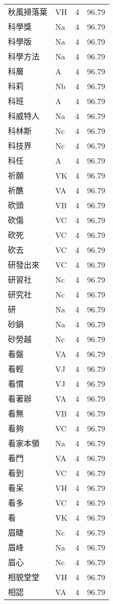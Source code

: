 \documentclass[twocolumn]{book}
\begin{document}
\begin{supertabular}{llrr}
秋風掃落葉 & VH & 4 &  96.79\\
科學獎 & Na & 4 &  96.79\\
科學版 & Na & 4 &  96.79\\
科學方法 & Na & 4 &  96.79\\
科層 & A & 4 &  96.79\\
科莉 & Nb & 4 &  96.79\\
科班 & A & 4 &  96.79\\
科威特人 & Na & 4 &  96.79\\
科林斯 & Nc & 4 &  96.79\\
科技界 & Nc & 4 &  96.79\\
科任 & A & 4 &  96.79\\
祈願 & VK & 4 &  96.79\\
祈醮 & VA & 4 &  96.79\\
砍頭 & VB & 4 &  96.79\\
砍傷 & VC & 4 &  96.79\\
砍死 & VC & 4 &  96.79\\
砍去 & VC & 4 &  96.79\\
研發出來 & VC & 4 &  96.79\\
研習社 & Nc & 4 &  96.79\\
研究社 & Nc & 4 &  96.79\\
研 & Na & 4 &  96.79\\
砂鍋 & Na & 4 &  96.79\\
砂勞越 & Nc & 4 &  96.79\\
看盤 & VA & 4 &  96.79\\
看輕 & VJ & 4 &  96.79\\
看慣 & VJ & 4 &  96.79\\
看著辦 & VA & 4 &  96.79\\
看無 & VB & 4 &  96.79\\
看夠 & VC & 4 &  96.79\\
看家本領 & Na & 4 &  96.79\\
看門 & VA & 4 &  96.79\\
看到 & VC & 4 &  96.79\\
看呆 & VH & 4 &  96.79\\
看多 & VC & 4 &  96.79\\
看 & VK & 4 &  96.79\\
眉睫 & Nc & 4 &  96.79\\
眉峰 & Na & 4 &  96.79\\
眉心 & Nc & 4 &  96.79\\
相貌堂堂 & VH & 4 &  96.79\\
相認 & VA & 4 &  96.79\\

\end{supertabular}
\end{document}
